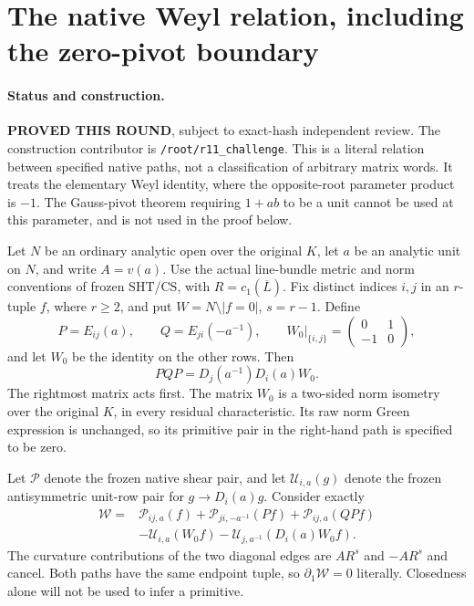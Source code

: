 \section{The native Weyl relation, including the zero-pivot boundary}
\label{sec:r11-native-weyl}

\paragraph{Status and construction.}
\textbf{PROVED THIS ROUND}, subject to exact-hash independent review.
The construction contributor is \texttt{/root/r11\_challenge}.
This is a literal relation between specified native paths, not a
classification of arbitrary matrix words.  It treats the elementary
Weyl identity, where the opposite-root parameter product is $-1$.
The Gauss-pivot theorem requiring $1+ab$ to be a unit cannot be used
at this parameter, and is not used in the proof below.

Let $N$ be an ordinary analytic open over the original $K$, let $a$
be an analytic unit on $N$, and write $A=v(a)$.  Use the actual
line-bundle metric and norm conventions of frozen SHT/CS, with
$R=c_1(\overline L)$.  Fix distinct indices $i,j$ in an $r$-tuple
$f$, where $r\ge2$, and put $W=N\setminus|f=0|$, $s=r-1$.
Define
\[
 P=E_{ij}(a),\qquad Q=E_{ji}(-a^{-1}),\qquad
 W_0|_{\{i,j\}}=\begin{pmatrix}0&1\\-1&0\end{pmatrix},
 \tag{WNR1}
\]
and let $W_0$ be the identity on the other rows.  Then
\[
             PQP=D_j(a^{-1})D_i(a)W_0.
 \tag{WNR2}
\]
The rightmost matrix acts first.  The matrix $W_0$ is a two-sided
norm isometry over the original $K$, in every residual characteristic.
Its raw norm Green expression is unchanged, so its primitive pair
in the right-hand path is specified to be zero.

Let $\mathcal P$ denote the frozen native shear pair, and let
$\mathcal U_{i,a}(g)$ denote the frozen antisymmetric unit-row pair
for $g\to D_i(a)g$.  Consider exactly
\[
 \begin{split}
 \mathscr W={}&\mathcal P_{ij,a}(f)
  +\mathcal P_{ji,-a^{-1}}(Pf)+\mathcal P_{ij,a}(QPf)\\
 &-\mathcal U_{i,a}(W_0f)
  -\mathcal U_{j,a^{-1}}(D_i(a)W_0f).
 \end{split}
 \tag{WNR3}
\]
The curvature contributions of the two diagonal edges are $A R^s$
and $-A R^s$ and cancel.  Both paths have the same endpoint tuple,
so $\partial_1\mathscr W=0$ literally.  Closedness alone will not
be used to infer a primitive.

